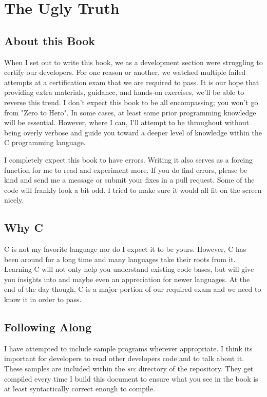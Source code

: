 \documentclass[../main.tex]{subfiles}
\begin{document}
	
\frontmatter
\chapter{The Ugly Truth}
\section{About this Book}
When I set out to write this book, we as a development section were struggling to certify our developers.  For one reason or another, we watched multiple failed attempts at a certification exam that we are required to pass. It is our hope that providing extra materials, guidance, and hands-on exercises, we'll be able to reverse this trend.  I don't expect this book to be all encompassing; you won't go from "Zero to Hero".  In some cases, at least some prior programming knowledge will be essential.  However, where I can, I'll attempt to be throughout without being overly verbose and guide you toward a deeper level of knowledge within the C programming language.

I completely expect this book to have errors.  Writing it also serves as a forcing function for me to read and experiment more.  If you do find errors, please be kind and send me a message or submit your fixes in a pull request.  Some of the code will frankly look a bit odd.  I tried to make sure it would all fit on the screen nicely.

\section{Why C}
C is not my favorite language nor do I expect it to be yours.  However, C has been around for a long time and many languages take their roots from it.  Learning C will not only help you understand existing code bases, but will give you insights into and maybe even an appreciation for newer languages.  At the end of the day though, C is a major portion of our required exam and we need to know it in order to pass.

\section{Following Along}
I have attempted to include sample programs wherever appropriate.  I think its important for developers to read other developers code and to talk about it.  These samples are included within the \textit{src} directory of the repository.  They get compiled every time I build this document to ensure what you see in the book is at least syntactically correct enough to compile.
\end{document}
